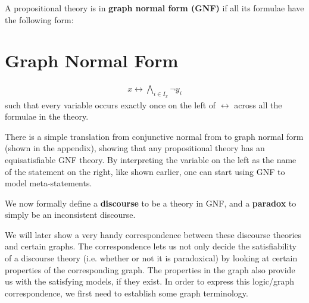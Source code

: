 A propositional theory is in \textbf{graph normal form (GNF)} if all its formulae have the following form:
\section{Graph Normal Form}
\label{sec:Graph Normal Form}
\begin{align}
  x \leftrightarrow \bigwedge_{i \in I_x} \neg y_i
\end{align}
such that every variable occurs exactly once on the left of $\leftrightarrow$ across all the formulae in the theory.

There is a simple translation from conjunctive normal from to graph normal form (shown in the appendix), showing that any propositional theory has an equisatisfiable GNF theory.
By interpreting the variable on the left as the name of the statement on the right, like shown earlier, one can start using GNF to model meta-statements.

We now formally define a \textbf{discourse} to be a theory in GNF, and a \textbf{paradox} to simply be an inconsistent discourse.

We will later show a very handy correspondence between these discourse theories and certain graphs.
The correspondence lets us not only decide the satisfiability of a discourse theory (i.e. whether or not it is paradoxical) by looking at certain properties of the corresponding graph.
The properties in the graph also provide us with the satisfying models, if they exist.
In order to express this logic/graph correspondence, we first need to establish some graph terminology.
